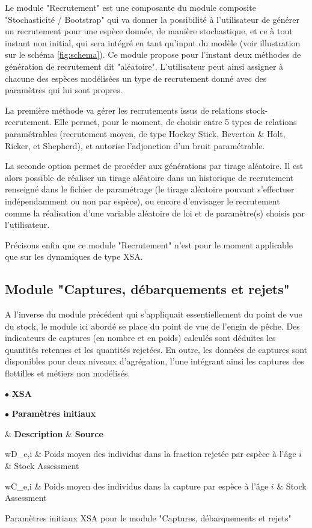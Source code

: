 \documentclass[12pt, colorinlistoftodos, notitlepage]{report}
\newenvironment{iTable}[3]{%
    \longtable{%
        |>{\centering$\displaystyle}A{#1}{1}<{$}%
        |>{\centering}A{#2}{1.5}%
        |>{\centering}A{#3}{1.5}%
        |}\hline\ignorespaces}{%
    \endlongtable\ignorespacesafterend}
\newenvironment{not used}[1]{%
    \longtable{%
        |>{\centering$\displaystyle}A{#1}{1}<{$}%
        |}\hline\ignorespaces}{%
    \endlongtable\ignorespacesafterend}
\newcommand{\tabnl}{
    \tabularnewline\hline
}
\begin{document}
Le module "Recrutement" est une composante du module composite "Stochasticité / Bootstrap" qui va donner la possibilité à l'utilisateur de générer un recrutement pour une espèce donnée, de manière stochastique, et ce à tout instant non initial, qui sera intégré en tant qu'input du modèle (voir illustration sur le schéma \ref{fig:schema}). Ce module propose pour l'instant deux méthodes de génération de recrutement dit "aléatoire". L'utilisateur peut ainsi assigner à chacune des espèces modélisées un type de recrutement donné avec des paramètres qui lui sont propres.
	
La première méthode va gérer les recrutements issus de relations stock-recrutement. Elle permet, pour le moment, de choisir entre 5 types de relations paramétrables (recrutement moyen, de type Hockey Stick, Beverton \& Holt, Ricker, et Shepherd), et autorise l'adjonction d'un bruit paramétrable.
	
La seconde option permet de procéder aux générations par tirage aléatoire. Il est alors possible de réaliser un tirage aléatoire dans un historique de recrutement renseigné dans le fichier de paramétrage (le tirage aléatoire pouvant s'effectuer indépendamment ou non par espèce), ou encore d'envisager le recrutement comme la réalisation d'une variable aléatoire de loi et de paramètre(s) choisis par l'utilisateur.
	
Précisons enfin que ce module "Recrutement" n'est pour le moment applicable que sur les dynamiques de type XSA.


\subsection{Module "Captures, débarquements et rejets"}

A l'inverse du module précédent qui s'appliquait essentiellement du point de vue du stock, le module ici abordé se place du point de vue de l'engin de pêche. Des indicateurs de captures (en nombre et en poids) calculés sont déduites les quantités retenues et les quantités rejetées. En outre, les données de captures sont disponibles pour deux niveaux d'agrégation, l'une intégrant ainsi les captures des flottilles et métiers non modélisés.

$\bullet$ \textbf{XSA}

\hspace{10mm}$\bullet$ \textbf{Paramètres initiaux} 

\begin{iTable}{0.17}{0.5}{0.33}
     & \textbf{Description} & \textbf{Source} \tabnl

    wD_{e,i} & Poids moyen des individus dans la fraction rejetée par espèce à l’âge $i$ & Stock Assessment \tabnl
    wC_{e,i} & Poids moyen des individus dans la capture par espèce à l’âge $i$ & Stock Assessment \tabnl


    \caption{Paramètres initiaux XSA pour le module "Captures, débarquements et rejets"}
\end{iTable}
\end{document}
